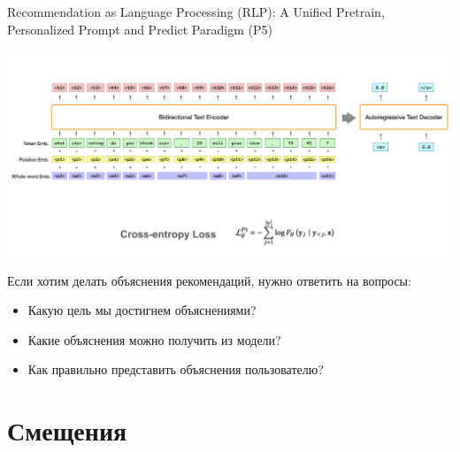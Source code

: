\documentclass[11pt,aspectratio=169,handout]{beamer}
\begin{document}
\begin{frame}{Recommendation as Language Processing (RLP): A Unified Pretrain, Personalized Prompt and Predict Paradigm (P5) \cite{P5}}

\begin{center}
\includegraphics[scale=0.25]{images/p5-arch.png}
\end{center}

\end{frame}

\begin{frame}

\begin{tcolorbox}[colback=info!5,colframe=info!80,title=]
Если хотим делать объяснения рекомендаций, нужно ответить на вопросы:
\begin{itemize}
\item Какую цель мы достигнем объяснениями?
\item Какие объяснения можно получить из модели?
\item Как правильно представить объяснения пользователю?
\end{itemize}
\end{tcolorbox}

\end{frame}

\section{Смещения}
\end{document}
